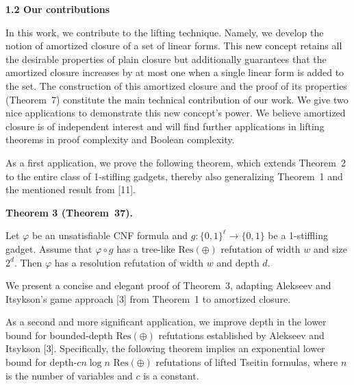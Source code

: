 \par\medskip\noindent\textbf{
1.2 Our contributions}\par


In this work, we contribute to the lifting technique. Namely, we develop the notion of amortized closure of a set of linear forms. This new concept retains all the desirable properties of plain closure but additionally guarantees that the amortized closure increases by at most one when a single linear form is added to the set. The construction of this amortized closure and the proof of its properties (Theorem 7) constitute the main technical contribution of our work. We give two nice applications to demonstrate this new concept’s power. We believe amortized closure is of independent interest and will find further applications in lifting theorems in proof complexity and Boolean complexity.\par



As a first application, we prove the following theorem, which extends Theorem 2 to the entire class of 1-stifling gadgets, thereby also generalizing Theorem 1 and the mentioned result from [11].\par



\par\medskip\noindent\textbf{
Theorem 3 (Theorem 37).
}\par



Let $\varphi$ be an unsatisfiable CNF formula and $g\colon\{0,1\}^{\ell}\to\{0,1\}$ be a 1-stiffling gadget.
Assume that $\varphi\circ g$ has a tree-like $\mathrm{Res}(\oplus)$ refutation of width $w$ and size $2^{d}$. Then $\varphi$ has a resolution refutation of width $w$ and depth $d$.\par




We present a concise and elegant proof of Theorem 3, adapting Alekseev and Itsykson’s game approach [3] from Theorem 1 to amortized closure.\par



As a second and more significant application, we improve depth in the lower bound for bounded-depth $\mathrm{Res}(\oplus)$ refutations established by Alekseev and Itsykson [3]. Specifically, the following theorem implies an exponential lower bound for depth-$cn\log n$ $\mathrm{Res}(\oplus)$ refutations of lifted Tseitin formulas, where $n$ is the number of variables and $c$ is a constant.\par



